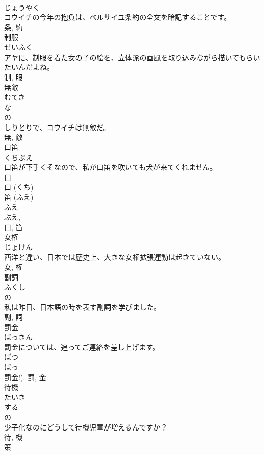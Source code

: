 \documentclass[8pt]{extreport}
\begin{document}
\begin{CJK}{UTF8}{min}
\\	じょうやく	
\\	コウイチの今年の抱負は、ベルサイユ条約の全文を暗記することです。	
\\	条, 約	
\\	制服	
\\	せいふく	
\\	アヤに、制服を着た女の子の絵を、立体派の画風を取り込みながら描いてもらいたいんだよね。	
\\	制, 服	
\\	無敵	
\\	むてき	
\\	な 
\\	の 
\\	しりとりで、コウイチは無敵だ。	
\\	無, 敵	
\\	口笛	
\\	くちぶえ	
\\	口笛が下手くそなので、私が口笛を吹いても犬が来てくれません。	
\\	口 
\\	口 (くち) 
\\	笛 (ふえ) 
\\	ふえ 
\\	ぶえ, 
\\	口, 笛	
\\	女権	
\\	じょけん	
\\	西洋と違い、日本では歴史上、大きな女権拡張運動は起きていない。	
\\	女, 権	
\\	副詞	
\\	ふくし	
\\	の 
\\	私は昨日、日本語の時を表す副詞を学びました。	
\\	副, 詞	
\\	罰金	
\\	ばっきん	
\\	罰金については、追ってご連絡を差し上げます。	
\\	ばつ 
\\	ばっ 
\\	罰金!).	罰, 金	
\\	待機	
\\	たいき	
\\	する 
\\	の 
\\	少子化なのにどうして待機児童が増えるんですか？	
\\	待, 機	
\\	策	

\end{CJK}
\end{document}
